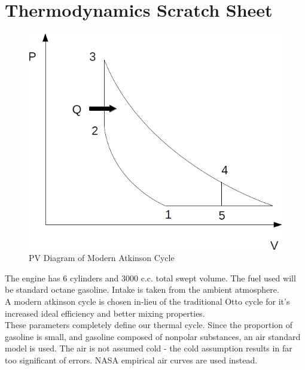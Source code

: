 \documentclass[10pt,a4paper]{article}
\begin{document}
\section*{Thermodynamics Scratch Sheet}


	\begin{figure}[h]
		\centering
		\includegraphics[width=.5\textwidth]{ThermoDiagram.png}
		\caption{PV Diagram of Modern Atkinson Cycle}
		\label{fig:diagram1}
	\end{figure}
	The engine has 6 cylinders and 3000 c.c. total swept volume. The fuel used will be standard octane gasoline. Intake is taken from the ambient atmosphere.\\
	A modern atkinson cycle is chosen in-lieu of the traditional Otto cycle for it's increased ideal efficiency and better mixing properties.\\
	These parameters completely define our thermal cycle. Since the proportion of gasoline is small, and gasoline composed of nonpolar substances, an air standard model is used. The air is not assumed cold - the cold assumption results in far too significant of errors. NASA empirical air curves are used instead.
\end{document}
